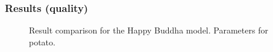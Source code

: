 \documentclass{beamer}
\begin{document}
\begin{frame}
    \frametitle{Results (quality)}
				\begin{figure}
\centering
{}
\vspace{-0.1cm}
\caption{Result comparison for the Happy Buddha model. Parameters for potato.}
\end{figure}
\end{frame}
\end{document}
